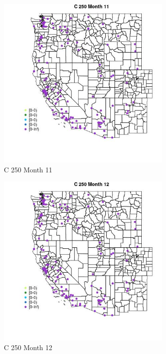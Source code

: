 \begin{figure} 
\centering  
\includegraphics[width=0.77\textwidth]{Code_Outputs/Report_ML_input_PM25_Step4_part_e_de_duplicated_aves_MapObsMo11C_250.jpg} 
\caption{\label{fig:Report_ML_input_PM25_Step4_part_e_de_duplicated_avesMapObsMo11C_250}C 250 Month 11} 
\end{figure} 
 

\begin{figure} 
\centering  
\includegraphics[width=0.77\textwidth]{Code_Outputs/Report_ML_input_PM25_Step4_part_e_de_duplicated_aves_MapObsMo12C_250.jpg} 
\caption{\label{fig:Report_ML_input_PM25_Step4_part_e_de_duplicated_avesMapObsMo12C_250}C 250 Month 12} 
\end{figure} 
 

